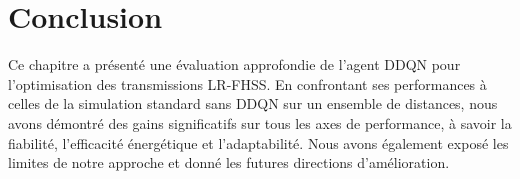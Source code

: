 \section{Conclusion}

Ce chapitre a présenté une évaluation approfondie de l'agent DDQN pour l'optimisation des transmissions LR-FHSS. En confrontant ses performances à celles de la simulation standard sans DDQN sur un ensemble de distances, nous avons démontré des gains significatifs sur tous les axes de performance, à savoir la fiabilité, l'efficacité énergétique et l'adaptabilité. Nous avons également exposé les limites de notre approche et donné les futures directions d'amélioration.